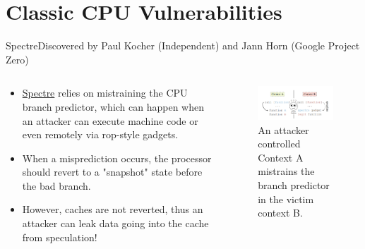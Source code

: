 \section{Classic CPU Vulnerabilities}
\frame{\sectionpage}

\begin{frame}{Spectre}{Discovered by Paul Kocher (Independent) and Jann Horn (Google Project Zero)}
    \label{spectre}
    \begin{columns}
        \begin{column}{0.5\textwidth}
            \begin{itemize}
                \item \href{https://spectreattack.com/spectre.pdf}{\color{pink}Spectre} relies on mistraining the CPU branch predictor, which can happen when an attacker can execute machine code or even remotely via rop-style gadgets.
                \item When a misprediction occurs, the processor should revert to a "snapshot" state before the bad branch.
                \item However, caches are not reverted, thus an attacker can leak data going into the cache from speculation!
            \end{itemize}
            \inputminted{c}{code/spectre.c}
        \end{column}
        \begin{column}{0.5\textwidth}
            \begin{figure}
                \centering
                \includegraphics[width=\textwidth]{images/spectre_paper_graphic.png}
                \caption{An attacker controlled Context A mistrains the branch predictor in the victim context B.}
                \label{fig:spectre-graphic}
            \end{figure}
        \end{column}
    \end{columns}
\end{frame}

